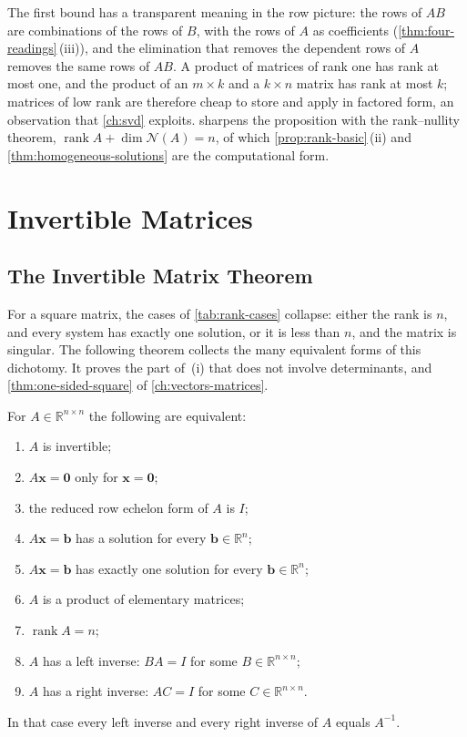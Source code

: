 The first bound has a transparent meaning in the row picture: the rows of $AB$ are combinations of the rows of $B$, with the rows of $A$ as coefficients (\cref{thm:four-readings}\,(iii)), and the elimination that removes the dependent rows of $A$ removes the same rows of $AB$. A product of matrices of rank one has rank at most one, and the product of an $m\times k$ and a $k\times n$ matrix has rank at most $k$; matrices of low rank are therefore cheap to store and apply in factored form, an observation that \cref{ch:svd} exploits.  sharpens the proposition with the rank--nullity theorem, $\operatorname{rank}A+\dim\mathcal N(A)=n$, of which \cref{prop:rank-basic}\,(ii) and \cref{thm:homogeneous-solutions} are the computational form.

\section{Invertible Matrices}
\label{sec:invertible}

\subsection{The Invertible Matrix Theorem}

For a square matrix, the cases of \cref{tab:rank-cases} collapse: either the rank is $n$, and every system has exactly one solution, or it is less than $n$, and the matrix is singular. The following theorem collects the many equivalent forms of this dichotomy. It proves the part of \,(i) that does not involve determinants, and \cref{thm:one-sided-square} of \cref{ch:vectors-matrices}.

\begin{theorem}
\label{thm:invertible}
For $A\in\mathbb R^{n\times n}$ the following are equivalent:
\begin{enumerate}
\item $A$ is invertible;
\item $A\mathbf x=\mathbf 0$ only for $\mathbf x=\mathbf 0$;
\item the reduced row echelon form of $A$ is $I$;
\item $A\mathbf x=\mathbf b$ has a solution for every $\mathbf b\in\mathbb R^n$;
\item $A\mathbf x=\mathbf b$ has exactly one solution for every $\mathbf b\in\mathbb R^n$;
\item $A$ is a product of elementary matrices;
\item $\operatorname{rank}A=n$;
\item $A$ has a left inverse: $BA=I$ for some $B\in\mathbb R^{n\times n}$;
\item $A$ has a right inverse: $AC=I$ for some $C\in\mathbb R^{n\times n}$.
\end{enumerate}
In that case every left inverse and every right inverse of $A$ equals $A^{-1}$.
\end{theorem}

